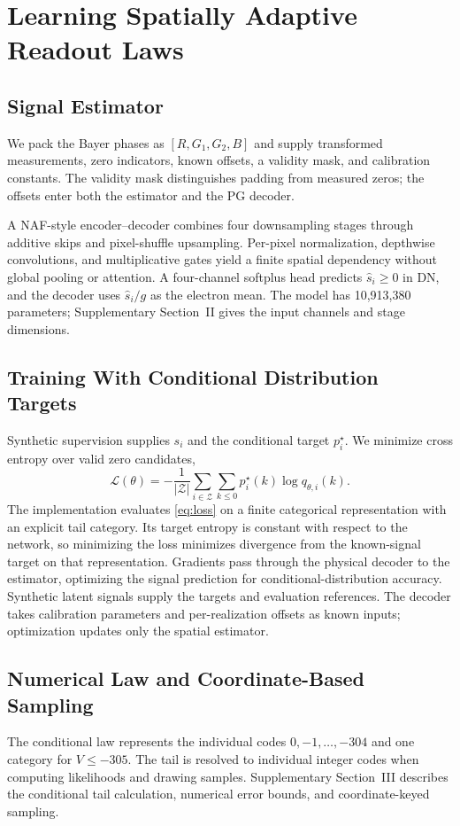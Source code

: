 \documentclass[10pt,twocolumn,journal]{IEEEtran}
\begin{document}
\section{Learning Spatially Adaptive Readout Laws}
\subsection{Signal Estimator}
We pack the Bayer phases as $[R,G_1,G_2,B]$ and supply transformed measurements, zero indicators, known offsets, a validity mask, and calibration constants. The validity mask distinguishes padding from measured zeros; the offsets enter both the estimator and the PG decoder.

A NAF-style encoder--decoder combines four downsampling stages through additive skips and pixel-shuffle upsampling. Per-pixel normalization, depthwise convolutions, and multiplicative gates yield a finite spatial dependency without global pooling or attention. A four-channel softplus head predicts $\hat s_i\geq0$ in DN, and the decoder uses $\hat s_i/g$ as the electron mean. The model has 10,913,380 parameters; Supplementary Section~II gives the input channels and stage dimensions.

\subsection{Training With Conditional Distribution Targets}
Synthetic supervision supplies $s_i$ and the conditional target $p_i^\star$. We minimize cross entropy over valid zero candidates,
\begin{equation}
\mathcal L(\theta)=-\frac{1}{|\mathcal Z|}
\sum_{i\in\mathcal Z}\sum_{k\leq0}p^{\star}_i(k)\log q_{\theta,i}(k).
\label{eq:loss}
\end{equation}
The implementation evaluates \eqref{eq:loss} on a finite categorical representation with an explicit tail category. Its target entropy is constant with respect to the network, so minimizing the loss minimizes divergence from the known-signal target on that representation. Gradients pass through the physical decoder to the estimator, optimizing the signal prediction for conditional-distribution accuracy. Synthetic latent signals supply the targets and evaluation references. The decoder takes calibration parameters and per-realization offsets as known inputs; optimization updates only the spatial estimator.

\subsection{Numerical Law and Coordinate-Based Sampling}
The conditional law represents the individual codes $0,-1,\ldots,-304$ and one category for $V\leq-305$. The tail is resolved to individual integer codes when computing likelihoods and drawing samples. Supplementary Section~III describes the conditional tail calculation, numerical error bounds, and coordinate-keyed sampling.
\end{document}
